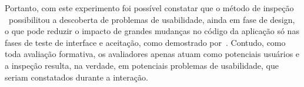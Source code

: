 Portanto, com este experimento foi  possível constatar que o método de
inspeção   \aladim\  possibilitou   a  descoberta   de   problemas  de
usabilidade, ainda em fase de design,  o que pode reduzir o impacto de
grandes  mudanças no  código da  aplicação só  nas fases  de  teste de
interface  e aceitação, como  demostrado por~.
Contudo, como  toda avaliação  formativa, os avaliadores  apenas atuam
como  potenciais  usuários  e  a  inspeção  resulta,  na  verdade,  em
potenciais problemas de usabilidade,  que seriam constatados durante a
interação.

